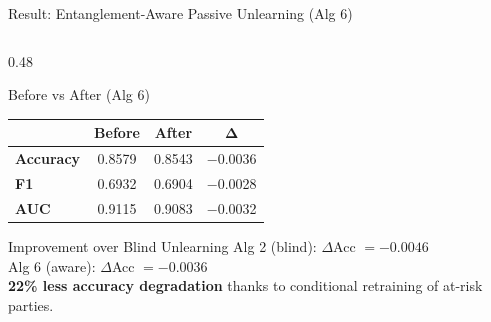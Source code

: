 \documentclass[aspectratio=169, 11pt]{beamer}
\begin{document}
\begin{frame}{Result: Entanglement-Aware Passive Unlearning (Alg 6)}
\begin{columns}[T]
\begin{column}{0.48\textwidth}
\begin{block}{Before vs After (Alg 6)}
        \centering
        \renewcommand{\arraystretch}{1.3}
        \begin{tabular}{>{\bfseries\footnotesize}l >{\footnotesize}c >{\footnotesize}c >{\footnotesize}c}
          \toprule
          & \textbf{Before} & \textbf{After} & $\boldsymbol{\Delta}$ \\
          \midrule
          Accuracy & 0.8579 & 0.8543 & \textcolor{accentred}{$-$0.0036} \\
          F1       & 0.6932 & 0.6904 & \textcolor{accentred}{$-$0.0028} \\
          AUC      & 0.9115 & 0.9083 & \textcolor{accentred}{$-$0.0032} \\
          \bottomrule
        \end{tabular}
      \end{block}
      \vspace{0.3cm}
      \begin{exampleblock}{Improvement over Blind Unlearning}
        \footnotesize
        Alg 2 (blind): $\Delta$Acc $= -0.0046$\\
        Alg 6 (aware): $\Delta$Acc $= -0.0036$\\[0.1cm]
        \textbf{22\% less accuracy degradation} thanks to conditional retraining of at-risk parties.
      \end{exampleblock}
    \end{column}
  \end{columns}
\end{frame}
\end{document}
